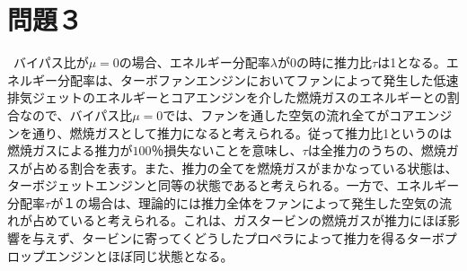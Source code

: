 \section*{\large 問題３}
\ 
バイパス比が$\mu=0$の場合、エネルギー分配率$\lambda$が$0$の時に推力比$\tau$は1となる。エネルギー分配率は、ターボファンエンジンにおいてファンによって発生した低速排気ジェットのエネルギーとコアエンジンを介した燃焼ガスのエネルギーとの割合なので、バイパス比$\mu=0$では、ファンを通した空気の流れ全てがコアエンジンを通り、燃焼ガスとして推力になると考えられる。従って推力比1というのは燃焼ガスによる推力が$100％$損失ないことを意味し、$\tau$は全推力のうちの、燃焼ガスが占める割合を表す。また、推力の全てを燃焼ガスがまかなっている状態は、ターボジェットエンジンと同等の状態であると考えられる。一方で、エネルギー分配率$\tau$が１の場合は、理論的には推力全体をファンによって発生した空気の流れが占めていると考えられる。これは、ガスタービンの燃焼ガスが推力にほぼ影響を与えず、タービンに寄ってくどうしたプロペラによって推力を得るターボプロップエンジンとほぼ同じ状態となる。

